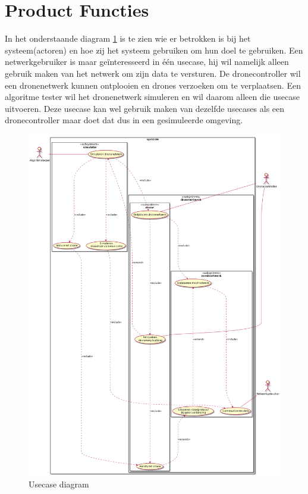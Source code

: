 \documentclass[a4paper, 11pt, oneside]{report}
\begin{document}
\section{Product Functies}
\label{inleiding:productfuncties}
In het onderstaande diagram \ref{fig:usecasediagram} is te zien wie er betrokken is bij het systeem(actoren) en hoe zij het systeem gebruiken om hun doel te gebruiken.
Een netwerkgebruiker is maar geïnteresseerd in één usecase, hij wil namelijk alleen gebruik maken van het netwerk om zijn data te versturen.
De dronecontroller wil een dronenetwerk kunnen ontplooien en drones verzoeken om te verplaatsen.
Een algoritme tester wil het dronenetwerk simuleren en wil daarom alleen die usecase uitvoeren.
Deze usecase kan wel gebruik maken van dezelfde usecases als een dronecontroller maar doet dat dus in een gesimuleerde omgeving. 
\begin{figure}[H]
	\begin{center}\includegraphics[width=1\linewidth]{UML/out/usecase/usecasediagram/usecasediagram.png}\end{center}
	\caption{Usecase diagram}
	\label{fig:usecasediagram}
\end{figure}
\end{document}

